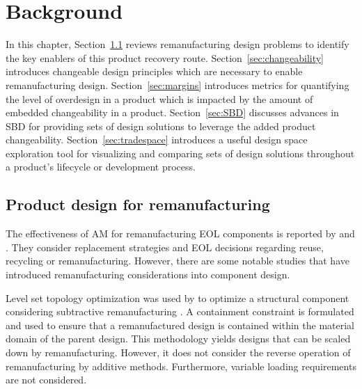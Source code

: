 \chapter{Background}
\label{ch:background}

In this chapter, Section~\ref{sec:remanufacturingdesign} reviews remanufacturing design problems to identify the key enablers of this product recovery route. Section~\ref{sec:changeability} introduces changeable design principles which are necessary to enable remanufacturing design. Section~\ref{sec:margins} introduces metrics for quantifying the level of overdesign in a product which is impacted by the amount of embedded changeability in a product. Section~\ref{sec:SBD} discusses advances in \ac{SBD} for providing sets of design solutions to leverage the added product changeability. Section~\ref{sec:tradespace} introduces a useful design space exploration tool for visualizing and comparing sets of design solutions throughout a product's lifecycle or development process.

\section{Product design for remanufacturing} \label{sec:remanufacturingdesign}

The effectiveness of \ac{AM} for remanufacturing \ac{EOL} components is reported by \citeauthor{VanThao2015} and \citeauthor{Wilson2014} \cite{VanThao2015,Wilson2014}. They consider replacement strategies and \ac{EOL} decisions regarding reuse, recycling or remanufacturing. However, there are some notable studies that have introduced remanufacturing considerations into component design.

Level set topology optimization was used by \citeauthor{Liu2017} to optimize a structural component considering subtractive remanufacturing \cite{Liu2017}. A containment constraint is formulated and used to ensure that a remanufactured design is contained within the material domain of the parent design. This methodology yields designs that can be scaled down by remanufacturing. However, it does not consider the reverse operation of remanufacturing by additive methods. Furthermore, variable loading requirements are not considered.

